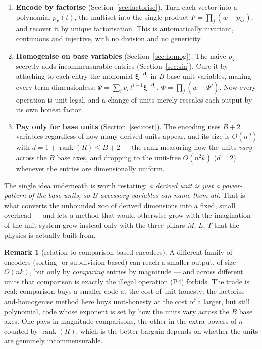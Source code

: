 \documentclass[11pt,a4paper]{article}
\theoremstyle{definition}
\newtheorem{remark}[definition]{Remark}
\theoremstyle{plain}
\newcommand{\bvec}[1]{\mathbf{#1}}
\begin{document}
\begin{enumerate}[leftmargin=*]
\item \textbf{Encode by factorise} (Section~\ref{sec:factorise}). Turn each vector
      into a polynomial $p_{\bvec v}(t)$, the multiset into the single product
      $F=\prod_j(w-p_{\bvec v^j})$, and recover it by unique factorisation. This is
      automatically invariant, continuous and injective, with no division and no
      genericity.
\item \textbf{Homogenise on base variables} (Section~\ref{sec:homog}). The naive
      $p_{\bvec v}$ secretly adds incommensurable entries (Section~\ref{sec:sin}).
      Cure it by attaching to each entry the monomial $\boldsymbol\xi^{-\bvec d_i}$
      in $B$ base-unit variables, making every term dimensionless:
      $\Psi=\sum_i v_i\,t^{i-1}\boldsymbol\xi^{-\bvec d_i}$,
      $\Phi=\prod_j(w-\Psi^j)$. Now every operation is unit-legal, and a change of
      units merely rescales each output by its own honest factor.
\item \textbf{Pay only for base units} (Section~\ref{sec:cost}). The encoding uses
      $B+2$ variables regardless of how many derived units appear, and its size is
      $O(n^{\,d})$ with $d=1+\operatorname{rank}(R)\le B+2$ --- the rank measuring how
      the units \emph{vary} across the $B$ base axes, and dropping to the unit-free
      $O(n^2k)$ ($d=2$) whenever the entries are dimensionally uniform.
\end{enumerate}

\noindent
The single idea underneath is worth restating: \emph{a derived unit is just a
power-pattern of the base units, so $B$ accessory variables can name them all.}
That is what converts the unbounded zoo of derived dimensions into a fixed,
small overhead --- and lets a method that would otherwise grow with the
imagination of the unit-system grow instead only with the three pillars
$M$, $L$, $T$ that the physics is actually built from.

\begin{remark}[relation to comparison-based encoders]\label{rmk:relation}
A different family of encoders (sorting- or subdivision-based) can reach a smaller
output, of size $O(nk)$, but only by \emph{comparing} entries by magnitude --- and
across different units that comparison is exactly the illegal operation (P4)
forbids. The trade is real: comparison buys a smaller code at the cost of
unit-honesty; the factorise-and-homogenise method here buys unit-honesty at the
cost of a larger, but still polynomial, code whose exponent is set by how the units
vary across the $B$ base axes. One pays in magnitude-comparisons, the other in the
extra powers of $n$ counted by $\operatorname{rank}(R)$; which is the better bargain
depends on whether the units are genuinely incommensurable.
\end{remark}
\end{document}
